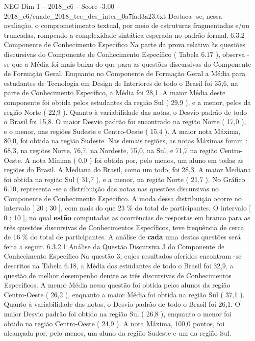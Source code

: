 \begin{textsample}{NEG Dim 1 – 2018\_c6 – Score -3.00 – 2018\_c6/enade\_2018\_tec\_des\_inter\_0a7fad3a23.txt}
Destaca -se, nessa avaliação, o comprometimento textual, por meio de estruturas fragmentadas e/ou truncadas, rompendo a complexidade sintática esperada no padrão formal. 6.3.2 Componente de Conhecimento Específico Na parte da prova relativa às questões discursivas do Componente de Conhecimento Específico ( Tabela 6.17 ), observa -se que a Média foi mais baixa do que para as questões discursivas do Componente de Formação Geral.
Enquanto no Componente de Formação Geral a Média para estudantes de Tecnologia em Design de Interiores de todo o Brasil foi 35,6, na parte de Conhecimento Específico, a Média foi 28,1.
A maior Média deste componente foi obtida pelos estudantes da região Sul ( 29,9 ), e a menor, pelos da região Norte ( 22,9 ).
Quanto à variabilidade das notas, o Desvio padrão de todo o Brasil foi 15,8.
O maior Desvio padrão foi encontrado na região Norte ( 17,0 ), e o menor, nas regiões Sudeste e Centro-Oeste ( 15,4 ).
A maior nota Máxima, 80,0, foi obtida na região Sudeste.
Nas demais regiões, as notas Máximas foram : 68,3, na regiões Norte, 76,7, na Nordeste, 75,0, na Sul, e 71,7 na região Centro-Oeste.
A nota Mínima ( 0,0 ) foi obtida por, pelo menos, um aluno em todas as regiões do Brasil.
A Mediana do Brasil, como um todo, foi 28,3.
A maior Mediana foi obtida na região Sul ( 31,7 ), e a menor, na região Norte ( 21,7 ).
No Gráfico 6.10, representa -se a distribuição das notas nas questões discursivas no Componente de Conhecimento Específico.
A moda dessa distribuição ocorre no intervalo [ 20 ; 30 ], com mais do que 23 \% do total de participantes.
O intervalo [ 0 ; 10 ], no qual \textbf{estão} computadas as ocorrências de respostas em branco para as três questões discursivas de Conhecimentos Específicos, teve frequência de cerca de 16 \% do total de participantes.
A análise de \textbf{cada} uma destas questões será feita a seguir. 6.3.2.1 Análise da Questão Discursiva 3 do Componente de Conhecimento Específico Na questão 3, cujos resultados aferidos encontram -se descritos na Tabela 6.18, a Média dos estudantes de todo o Brasil foi 32,9, a questão de melhor desempenho dentre as três discursivas de Conhecimentos Específicos.
A menor Média nessa questão foi obtida pelos alunos da região Centro-Oeste ( 26,2 ), enquanto a maior Média foi obtida na região Sul ( 37,1 ).
Quanto à variabilidade das notas, o Desvio padrão de todo o Brasil foi 26,1.
O maior Desvio padrão foi obtido na região Sul ( 26,8 ), enquanto o menor foi obtido na região Centro-Oeste ( 24,9 ).
A nota Máxima, 100,0 pontos, foi alcançada por, pelo menos, um aluno da região Sudeste e um da região Sul.

\end{textsample}
